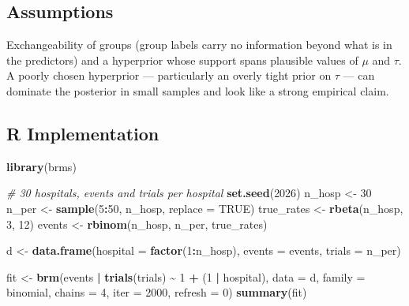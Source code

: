 \documentclass[
]{article}
\newenvironment{Shaded}{\begin{snugshade}}{\end{snugshade}}
\newcommand{\AttributeTok}[1]{\textcolor[rgb]{0.13,0.29,0.53}{#1}}
\newcommand{\CommentTok}[1]{\textcolor[rgb]{0.56,0.35,0.01}{\textit{#1}}}
\newcommand{\ConstantTok}[1]{\textcolor[rgb]{0.56,0.35,0.01}{#1}}
\newcommand{\DecValTok}[1]{\textcolor[rgb]{0.00,0.00,0.81}{#1}}
\newcommand{\FunctionTok}[1]{\textcolor[rgb]{0.13,0.29,0.53}{\textbf{#1}}}
\newcommand{\NormalTok}[1]{#1}
\newcommand{\OtherTok}[1]{\textcolor[rgb]{0.56,0.35,0.01}{#1}}
\newcommand{\SpecialCharTok}[1]{\textcolor[rgb]{0.81,0.36,0.00}{\textbf{#1}}}
\begin{document}
\subsection{Assumptions}\label{assumptions}

Exchangeability of groups (group labels carry no information beyond what
is in the predictors) and a hyperprior whose support spans plausible
values of \(\mu\) and \(\tau\). A poorly chosen hyperprior ---
particularly an overly tight prior on \(\tau\) --- can dominate the
posterior in small samples and look like a strong empirical claim.

\subsection{R Implementation}\label{r-implementation}

\begin{Shaded}
\begin{Highlighting}[]
\FunctionTok{library}\NormalTok{(brms)}

\CommentTok{\# 30 hospitals, events and trials per hospital}
\FunctionTok{set.seed}\NormalTok{(}\DecValTok{2026}\NormalTok{)}
\NormalTok{n\_hosp }\OtherTok{\textless{}{-}} \DecValTok{30}
\NormalTok{n\_per  }\OtherTok{\textless{}{-}} \FunctionTok{sample}\NormalTok{(}\DecValTok{5}\SpecialCharTok{:}\DecValTok{50}\NormalTok{, n\_hosp, }\AttributeTok{replace =} \ConstantTok{TRUE}\NormalTok{)}
\NormalTok{true\_rates }\OtherTok{\textless{}{-}} \FunctionTok{rbeta}\NormalTok{(n\_hosp, }\DecValTok{3}\NormalTok{, }\DecValTok{12}\NormalTok{)}
\NormalTok{events }\OtherTok{\textless{}{-}} \FunctionTok{rbinom}\NormalTok{(n\_hosp, n\_per, true\_rates)}

\NormalTok{d }\OtherTok{\textless{}{-}} \FunctionTok{data.frame}\NormalTok{(}\AttributeTok{hospital =} \FunctionTok{factor}\NormalTok{(}\DecValTok{1}\SpecialCharTok{:}\NormalTok{n\_hosp),}
                \AttributeTok{events =}\NormalTok{ events, }\AttributeTok{trials =}\NormalTok{ n\_per)}

\NormalTok{fit }\OtherTok{\textless{}{-}} \FunctionTok{brm}\NormalTok{(events }\SpecialCharTok{|} \FunctionTok{trials}\NormalTok{(trials) }\SpecialCharTok{\textasciitilde{}} \DecValTok{1} \SpecialCharTok{+}\NormalTok{ (}\DecValTok{1} \SpecialCharTok{|}\NormalTok{ hospital),}
           \AttributeTok{data =}\NormalTok{ d, }\AttributeTok{family =}\NormalTok{ binomial,}
           \AttributeTok{chains =} \DecValTok{4}\NormalTok{, }\AttributeTok{iter =} \DecValTok{2000}\NormalTok{, }\AttributeTok{refresh =} \DecValTok{0}\NormalTok{)}
\FunctionTok{summary}\NormalTok{(fit)}
\end{Highlighting}
\end{Shaded}
\end{document}

